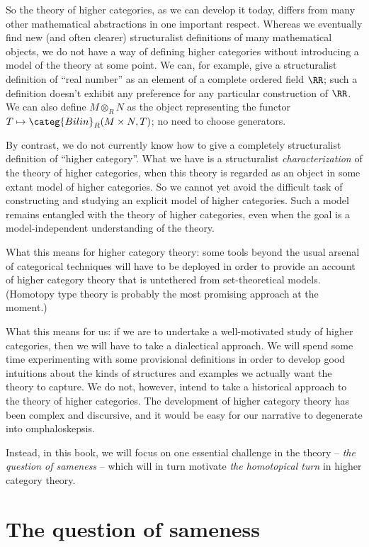 So the theory of higher categories, as we can develop it today, differs from many other mathematical abstractions in one important respect.
Whereas we eventually find new (and often clearer) structuralist definitions of many mathematical objects,
we do not have a way of defining higher categories without introducing a model of the theory at some point.
We can, for example, give a structuralist definition of \enquote{real number} as an element of a complete ordered field $\RR$;
such a definition doesn't exhibit any preference for any particular construction of $\RR$.
We can also define $M \otimes_R N$ as the object representing the functor $T \mapsto \categ{Bilin}_R(M \times N, T)$;
no need to choose generators.

By contrast, we do not currently know how to give a completely structuralist definition of \enquote{higher category}.
What we have is a structuralist \emph{characterization} of the theory of higher categories, when this theory is regarded as an object in some extant model of higher categories.
So we cannot yet avoid the difficult task of constructing and studying an explicit model of higher categories.
Such a model remains entangled with the theory of higher categories,
even when the goal is a model-independent understanding of the theory.

What this means for higher category theory:
some tools beyond the usual arsenal of categorical techniques will have to be deployed in order to provide an account of higher category theory that is untethered from set-theoretical models.
(Homotopy type theory is probably the most promising approach at the moment.)

What this means for us:
if we are to undertake a well-motivated study of higher categories, then
we will have to take a dialectical approach.
We will spend some time experimenting with some provisional definitions in order to develop good intuitions about the kinds of structures and examples we actually want the theory to capture.
We do not, however, intend to take a historical approach to the theory of higher categories.
The development of higher category theory has been complex and discursive, and
it would be easy for our narrative to degenerate into omphaloskepsis.

Instead, in this book, we will focus on one essential challenge in the theory -- \emph{the question of sameness} -- which will in turn motivate \emph{the homotopical turn} in higher category theory.

\section*{The question of sameness}%
\label{sec:sameness}%


